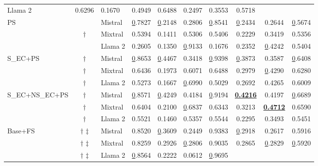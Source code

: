 \begin{table*}[!h]
\begin{tabular}{@{}lclccccccc@{}}
  Llama 2 &
  0.6296 &
  0.1670 &
  0.4949 &
  0.6488 &
  0.2497 &
  0.3553 &
  0.5718 \\ \cmidrule(l){3-10}
\multirow{3}{*}{PS} &
  &
  Mistral &
  {\ul 0.7827} &
  {\ul 0.2148} &
  0.2806 &
  {\ul 0.8541} &
  {\ul 0.2434} &
  0.2644 &
  {\ul 0.5674} \\
 &
  $\dagger$ \hspace{0.46em} &
  Mixtral &
  0.5394 &
  0.1411 &
  0.5306 &
  0.5406 &
  0.2229 &
  0.3419 &
  0.5356 \\
 &
  &
  Llama 2 &
  0.2605 &
  0.1350 &
  {\ul 0.9133} &
  0.1676 &
  0.2352 &
  {\ul 0.4242} &
  0.5404 \\ \cmidrule(l){3-10}
\multirow{3}{*}{S\_EC+PS} &
  $\dagger$ \hspace{0.46em} &
  Mistral &
  {\ul 0.8653} &
  {\ul 0.4467} &
  0.3418 &
  {\ul 0.9398} &
  {\ul 0.3873} &
  0.3587 &
  {\ul 0.6408} \\
 &
  $\dagger$ \hspace{0.46em} &
  Mixtral &
  0.6436 &
  0.1973 &
  0.6071 &
  0.6488 &
  0.2979 &
  {\ul 0.4290} &
  0.6280 \\
 &
  $\dagger$ \hspace{0.46em} &
  Llama 2 &
  0.5273 &
  0.1667 &
  {\ul 0.6990} &
  0.5029 &
  0.2692 &
  0.4265 &
  0.6009 \\ \cmidrule(l){3-10}
\multirow{3}{*}{S\_EC+NS\_EC+PS} &
  $\dagger$ \hspace{0.46em} &
  Mistral &
  {\ul 0.8571} &
  {\ul 0.4249} &
  0.4184 &
  {\ul 0.9194} &
  {\ul \textbf{0.4216}} &
  0.4197 &
  {\ul 0.6689} \\
 &
  $\dagger$ \hspace{0.46em} &
  Mixtral &
  0.6404 &
  0.2100 &
  {\ul 0.6837} &
  0.6343 &
  0.3213 &
  {\ul \textbf{0.4712}} &
  0.6590 \\
 &
  $\dagger$ \hspace{0.46em} &
  Llama 2 &
  0.5521 &
  0.1460 &
  0.5357 &
  0.5544 &
  0.2295 &
  0.3493 &
  0.5451 \\ \midrule %
  \midrule
\multirow{3}{*}{Base+FS} &
  $\dagger$ $\ddagger$ &
  Mistral &
  0.8520 &
  {\ul 0.3609} &
  0.2449 &
  0.9383 &
  {\ul 0.2918} &
  0.2617 &
  0.5916 \\
 &
  $\dagger$ $\ddagger$ &
  Mixtral &
  0.8259 &
  0.2926 &
  {\ul 0.2806} &
  0.9035 &
  0.2865 &
  {\ul 0.2829} &
  {\ul 0.5920} \\
 &
  $\dagger$ $\ddagger$ &
  Llama 2 &
  {\ul 0.8564} &
  0.2222 &
  0.0612 &
  {\ul 0.9695} &

\end{tabular}
\end{table*}
